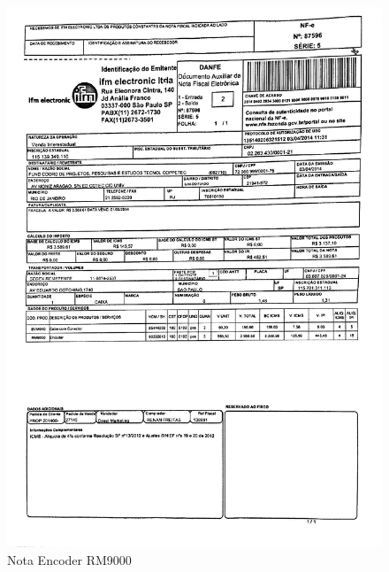 \begin{figure}[h!]
 \centering
 \includegraphics[width=1\columnwidth]{Encoder/nota_encoder.pdf}
 \caption{Nota Encoder RM9000}
 \end{figure}